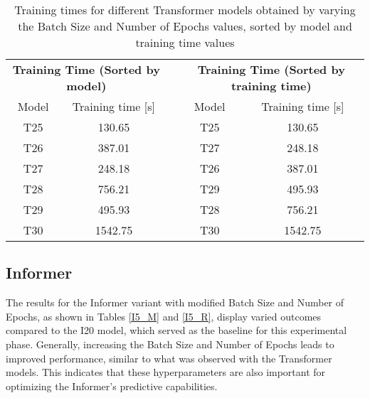     
\begin{table}[]
    \begin{tabular}{ccccc}
    \multicolumn{2}{c}{\textbf{Training   Time (Sorted by model)}} &  & \multicolumn{2}{c}{\textbf{Training Time (Sorted   by training time)}} \\
    Model             & Training time {[}s{]}                      &  & Model                 & Training time {[}s{]}                          \\
    T25               & \cellcolor[HTML]{63BE7B}130.65             &  & T25                   & \cellcolor[HTML]{63BE7B}130.65                 \\
    T26               & \cellcolor[HTML]{E3E382}387.01             &  & T27                   & \cellcolor[HTML]{9DCF7E}248.18                 \\
    T27               & \cellcolor[HTML]{9DCF7E}248.18             &  & T26                   & \cellcolor[HTML]{E3E382}387.01                 \\
    T28               & \cellcolor[HTML]{FDC67D}756.21             &  & T29                   & \cellcolor[HTML]{FFE583}495.93                 \\
    T29               & \cellcolor[HTML]{FFE583}495.93             &  & T28                   & \cellcolor[HTML]{FDC67D}756.21                 \\
    T30               & \cellcolor[HTML]{F8696B}1542.75            &  & T30                   & \cellcolor[HTML]{F8696B}1542.75               
    \end{tabular}
    \caption{Training times for different Transformer models obtained by varying the Batch Size and Number of Epochs values, sorted by model and training time values}
    \label{T5_T}
    \end{table}



\subsection{Informer}
The results for the Informer variant with modified Batch Size and Number of Epochs, as shown in Tables \ref{I5_M} and \ref{I5_R}, display varied outcomes compared to the I20 model, which served as the baseline for this experimental phase. Generally, increasing the Batch Size and Number of Epochs leads to improved performance, similar to what was observed with the Transformer models. This indicates that these hyperparameters are also important for optimizing the Informer's predictive capabilities.

